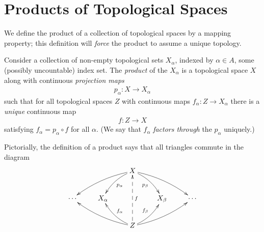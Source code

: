     \section{Products of Topological Spaces}
    We define the product of a collection of topological spaces by a mapping property; this definition will \emph{force} the product to assume a unique topology.
      \begin{defn}
        Consider a collection of non-empty topological sets $X_\alpha$, indexed by $\alpha\in A$, some (possibly uncountable) index set.
        The \emph{product} of the $X_\alpha$ is a topological space $X$ along with continuous \emph{projection maps} 
        \begin{align*}
          p_\alpha:X\longrightarrow X_\alpha
        \end{align*}
        such that for all topological spaces $Z$ with continuous maps $f_\alpha:Z\rightarrow X_\alpha$ there is a \emph{unique} continuous map 
        \begin{align*}
          f:Z\longrightarrow X
        \end{align*}
        satisfying $f_\alpha=p_\alpha\circ f$ for all $\alpha$.
        (We say that $f_\alpha$ \emph{factors through} the $p_\alpha$ uniquely.)
      \end{defn}
      Pictorially, the definition of a product says that all triangles commute in the diagram
      \begin{displaymath}
        \xymatrix{
          && X \ar@/_/[dll] \ar@/_/[dl]^{p_\alpha} \ar@/^/[dr]_{p_\beta} \ar@/^/[drr] \\
          \cdots & X_\alpha && X_\beta & \cdots\\
          && Z \ar@/^/[ull] \ar@/^/[ul]_{f_\alpha} \ar@{-->}[uu]_f \ar@/_/[ur]^{f_\beta} \ar@/_/[urr]
         }
      \end{displaymath}

